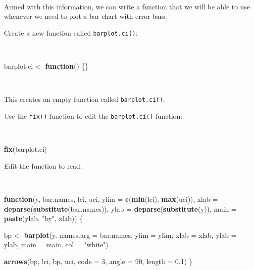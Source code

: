 \documentclass[12pt,a4paper]{book}
\newenvironment{Shaded}{\begin{snugshade}}{\end{snugshade}}
\newcommand{\ControlFlowTok}[1]{\textcolor[rgb]{0.13,0.29,0.53}{\textbf{#1}}}
\newcommand{\DataTypeTok}[1]{\textcolor[rgb]{0.13,0.29,0.53}{#1}}
\newcommand{\DecValTok}[1]{\textcolor[rgb]{0.00,0.00,0.81}{#1}}
\newcommand{\FloatTok}[1]{\textcolor[rgb]{0.00,0.00,0.81}{#1}}
\newcommand{\KeywordTok}[1]{\textcolor[rgb]{0.13,0.29,0.53}{\textbf{#1}}}
\newcommand{\NormalTok}[1]{#1}
\newcommand{\StringTok}[1]{\textcolor[rgb]{0.31,0.60,0.02}{#1}}
\theoremstyle{definition}
\theoremstyle{definition}
\theoremstyle{definition}
\theoremstyle{remark}
\begin{document}
~

Armed with this information, we can write a function that we will be
able to use whenever we need to plot a bar chart with error bars.

Create a new function called \texttt{barplot.ci()}:

~

\begin{Shaded}
\begin{Highlighting}[]
\NormalTok{barplot.ci <-}\StringTok{ }\ControlFlowTok{function}\NormalTok{() \{\}}
\end{Highlighting}
\end{Shaded}

~

This creates an empty function called \texttt{barplot.ci()}.

Use the \texttt{fix()} function to edit the \texttt{barplot.ci()}
function:

~

\begin{Shaded}
\begin{Highlighting}[]
\KeywordTok{fix}\NormalTok{(barplot.ci)}
\end{Highlighting}
\end{Shaded}

\newpage

Edit the function to read:

~

\begin{Shaded}
\begin{Highlighting}[]
\ControlFlowTok{function}\NormalTok{(y, bar.names, lci, uci,}
         \DataTypeTok{ylim =} \KeywordTok{c}\NormalTok{(}\KeywordTok{min}\NormalTok{(lci), }\KeywordTok{max}\NormalTok{(uci)),}
         \DataTypeTok{xlab =} \KeywordTok{deparse}\NormalTok{(}\KeywordTok{substitute}\NormalTok{(bar.names)),}
         \DataTypeTok{ylab =} \KeywordTok{deparse}\NormalTok{(}\KeywordTok{substitute}\NormalTok{(y)),}
         \DataTypeTok{main =} \KeywordTok{paste}\NormalTok{(ylab, }\StringTok{"by"}\NormalTok{, xlab)) \{}
     
\NormalTok{  bp <-}\StringTok{ }\KeywordTok{barplot}\NormalTok{(y, }\DataTypeTok{names.arg =}\NormalTok{ bar.names, }\DataTypeTok{ylim =}\NormalTok{ ylim, }\DataTypeTok{xlab =}\NormalTok{ xlab,}
                \DataTypeTok{ylab =}\NormalTok{ ylab, }\DataTypeTok{main =}\NormalTok{ main, }\DataTypeTok{col =} \StringTok{"white"}\NormalTok{)}
     
  \KeywordTok{arrows}\NormalTok{(bp, lci, bp, uci, }\DataTypeTok{code =} \DecValTok{3}\NormalTok{, }\DataTypeTok{angle =} \DecValTok{90}\NormalTok{, }\DataTypeTok{length =} \FloatTok{0.1}\NormalTok{)}
\NormalTok{\}}
\end{Highlighting}
\end{Shaded}
\end{document}
